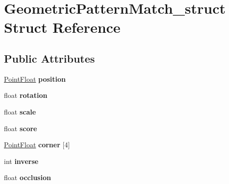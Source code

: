 \hypertarget{structGeometricPatternMatch__struct}{
\section{GeometricPatternMatch\_\-struct Struct Reference}
\label{structGeometricPatternMatch__struct}
}
\subsection*{Public Attributes}
\begin{DoxyCompactItemize}
\item 
\hypertarget{structGeometricPatternMatch__struct_ab5254448e23f118c6c0c663e88a98992}{
\hyperlink{structPointFloat__struct}{PointFloat} {\bfseries position}}
\label{structGeometricPatternMatch__struct_ab5254448e23f118c6c0c663e88a98992}

\item 
\hypertarget{structGeometricPatternMatch__struct_a585051ffaa969f57ce86c1c1ae738bc8}{
float {\bfseries rotation}}
\label{structGeometricPatternMatch__struct_a585051ffaa969f57ce86c1c1ae738bc8}

\item 
\hypertarget{structGeometricPatternMatch__struct_a5385ddac4b58b9a715042e344908d9b9}{
float {\bfseries scale}}
\label{structGeometricPatternMatch__struct_a5385ddac4b58b9a715042e344908d9b9}

\item 
\hypertarget{structGeometricPatternMatch__struct_a2dfed99cc3f4dd14e344807cacddbc7c}{
float {\bfseries score}}
\label{structGeometricPatternMatch__struct_a2dfed99cc3f4dd14e344807cacddbc7c}

\item 
\hypertarget{structGeometricPatternMatch__struct_a50c0afd80a114d444d59273992493e8d}{
\hyperlink{structPointFloat__struct}{PointFloat} {\bfseries corner} \mbox{[}4\mbox{]}}
\label{structGeometricPatternMatch__struct_a50c0afd80a114d444d59273992493e8d}

\item 
\hypertarget{structGeometricPatternMatch__struct_ac33376d8d193083ed257851a2a1bdd0d}{
int {\bfseries inverse}}
\label{structGeometricPatternMatch__struct_ac33376d8d193083ed257851a2a1bdd0d}

\item 
\hypertarget{structGeometricPatternMatch__struct_aff956b8b374f4c2cacb8617085c9bc90}{
float {\bfseries occlusion}}
\label{structGeometricPatternMatch__struct_aff956b8b374f4c2cacb8617085c9bc90}


\end{DoxyCompactItemize}
